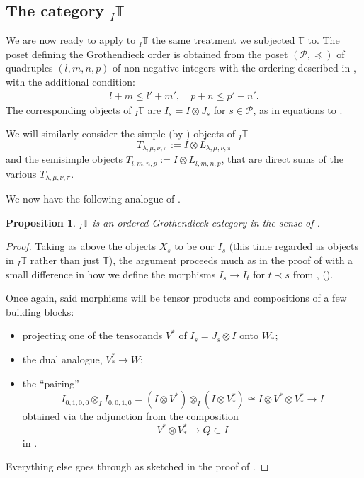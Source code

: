 \documentclass[11pt]{article}
\theoremstyle{plain}
\newtheorem{proposition}[lemma]{Proposition}
\theoremstyle{nonumberplain}
\theoremstyle{plain}
\numberwithin{equation}{section}
\theoremstyle{nonumberplain}
\newtheorem{proof}{Proof}
\newcommand\bT{{\mathbb T}}
\newcommand\cP{{\mathcal P}}
\newcommand\1{{\bf 1}}
\begin{document}
\subsection{The category ${}_I\bT$}\label{subse:modsord}

We are now ready to apply to ${}_I\bT$ the same treatment we subjected $\bT$ to. The poset defining the Grothendieck order is obtained from the poset $(\mathcal{P},\preceq)$ of quadruples $(l,m,n,p)$ of non-negative integers with the ordering described in , with the additional condition:
\begin{gather}\label{Formula new relation}
	l+m\leq l'+m' ,\quad p+n \leq p'+n' .
\end{gather}
The corresponding objects of ${_I}\mathbb{T}$ are $I_s=I\otimes J_s$ for $s\in \cP$, as in equations  to .  

We will similarly consider the simple (by ) objects of ${}_I\bT$
\begin{equation}\label{eq:deft}
  T_{\lambda,\mu,\nu,\pi}:=I\otimes L_{\lambda,\mu,\nu,\pi}
\end{equation}
and the semisimple objects $T_{l,m,n,p}:=I\otimes L_{l,m,n,p}$, %
 that are direct sums of the various $T_{\lambda,\mu,\nu,\pi}$. 

We now have the following analogue of .

\begin{proposition}\label{pr.itis-ordered}
${}_I\bT$ is an ordered Grothendieck category in the sense of .   
\end{proposition}
\begin{proof}
  Taking as above the objects $X_s$ to be our $I_s$ (this time regarded as objects in ${}_I\bT$ rather than just $\bT$), the argument proceeds much as in the proof of  with a small difference in how we define the morphisms $I_s\to I_t$ for $t\prec s$ from , ().

  Once again, said morphisms will be tensor products and compositions of a few building blocks:
  \begin{itemize}
  \item[$-$] projecting one of the tensorands $V^*$ of $I_s=J_s\otimes I$ onto $W_*$;
  \item[$-$] the dual analogue, $V^*_*\to W$;
  \item[$-$] the ``pairing''
    \begin{equation}\label{eq:realpair}
      I_{0,1,0,0}\otimes_I I_{0,0,1,0} = (I\otimes V^*)\otimes_{I} (I\otimes V_*^*)\cong I\otimes V^*\otimes V_*^*\to I
    \end{equation}
    obtained via the adjunction  from the composition
    \begin{equation*}
      V^*\otimes V_*^*\to Q\subset I
    \end{equation*}
    in . 
  \end{itemize}
  Everything else goes through as sketched in the proof of . 
\end{proof}
\end{document}
